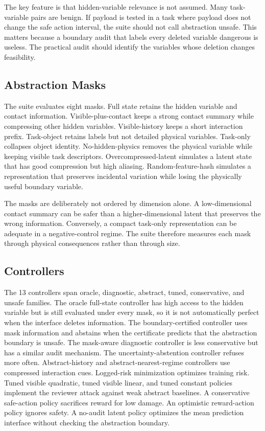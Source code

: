 \documentclass{article}
\begin{document}
The key feature is that hidden-variable relevance is not assumed. Many
task-variable pairs are benign. If payload is tested in a task where payload does
not change the safe action interval, the suite should not call abstraction
unsafe. This matters because a boundary audit that labels every deleted variable
dangerous is useless. The practical audit should identify the variables whose
deletion changes feasibility.

\subsection{Abstraction Masks}

The suite evaluates eight masks. Full state retains the hidden variable and
contact information. Visible-plus-contact keeps a strong contact summary while
compressing other hidden variables. Visible-history keeps a short interaction
prefix. Task-object retains labels but not detailed physical variables. Task-only
collapses object identity. No-hidden-physics removes the physical variable while
keeping visible task descriptors. Overcompressed-latent simulates a latent state
that has good compression but high aliasing. Random-feature-hash simulates a
representation that preserves incidental variation while losing the physically
useful boundary variable.

The masks are deliberately not ordered by dimension alone. A low-dimensional
contact summary can be safer than a higher-dimensional latent that preserves the
wrong information. Conversely, a compact task-only representation can be adequate
in a negative-control regime. The suite therefore measures each mask through
physical consequences rather than through size.

\subsection{Controllers}

The 13 controllers span oracle, diagnostic, abstract, tuned, conservative, and
unsafe families. The oracle full-state controller has high access to the hidden
variable but is still evaluated under every mask, so it is not automatically
perfect when the interface deletes information. The boundary-certified controller
uses mask information and abstains when the certificate predicts that the
abstraction boundary is unsafe. The mask-aware diagnostic controller is less
conservative but has a similar audit mechanism. The uncertainty-abstention
controller refuses more often. Abstract-history and abstract-nearest-regime
controllers use compressed interaction cues. Logged-risk minimization optimizes
training risk. Tuned visible quadratic, tuned visible linear, and tuned constant
policies implement the reviewer attack against weak abstract baselines. A
conservative safe-action policy sacrifices reward for low damage. An optimistic
reward-action policy ignores safety. A no-audit latent policy optimizes the mean
prediction interface without checking the abstraction boundary.
\end{document}
